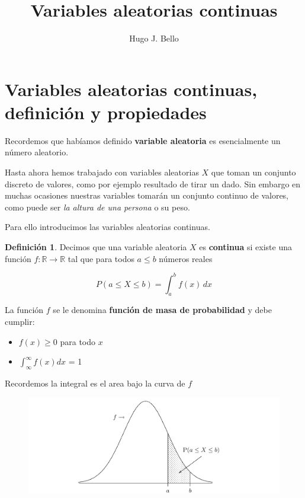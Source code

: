 \documentclass[]{book}
\title{Variables aleatorias continuas}
\author{Hugo J. Bello}
\date{}
\providecommand{\tightlist}{%
  \setlength{\itemsep}{0pt}\setlength{\parskip}{0pt}}
\theoremstyle{plain}
\theoremstyle{definition}
\newtheorem{definition}[theorem]{Definición}
\theoremstyle{definition} %
\begin{document}
\maketitle

\section{Variables aleatorias continuas, definición y
propiedades} 

Recordemos que habíamos definido \textbf{variable aleatoria} es
esencialmente un número aleatorio.

Hasta ahora hemos trabajado con variables aleatorias \(X\) que toman un
conjunto discreto de valores, como por ejemplo resultado de tirar un
dado. Sin embargo en muchas ocasiones nuestras variables tomarán un
conjunto continuo de valores, como puede ser \emph{la altura de una
persona} o su peso.

Para ello introducimos las variables aleatorias continuas.


\begin{definition}
  Decimos que una variable aleatoria \(X\) es \textbf{continua} si existe
una función \(f:\mathbb R \to \mathbb R\) tal que para todos \(a\leq b\)
números reales

\[\displaystyle P(a\leq X\leq b)=\int _{a}^{b}f(x)\,dx\]

La función \(f\) se le denomina \textbf{función de masa de probabilidad}
y debe cumplir:

\begin{itemize}
\tightlist
\item
  \(f(x)\geq 0\) para todo \(x\)
\item
  \(\int^\infty_\infty f(x)dx\) = 1
\end{itemize}

Recordemos la integral es el area bajo la curva de \(f\)

\end{definition}


\begin{figure}
  \centering
  \includegraphics[width=5in,height=\textheight]{img/sc_1.png}
  \caption{ }
\end{figure} 
\end{document}
